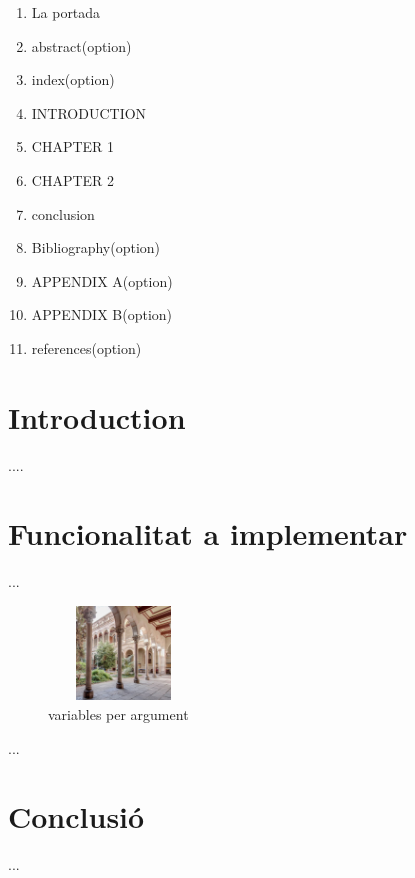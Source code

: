 \documentclass{article}
\begin{document}













\begin{enumerate}
  \item La portada
  \item abstract(option)
  \item index(option)
  \item INTRODUCTION
  \item CHAPTER 1
  \item CHAPTER 2
  \item conclusion
  \item Bibliography(option)
  \item APPENDIX A(option)
  \item APPENDIX B(option)
  \item references(option)
\end{enumerate}









\section{Introduction}


....
 
\section{Funcionalitat a implementar}

...

\begin{figure}[H]
    \centering
    \includegraphics[width=4cm, height=2.5cm]{images/edifici-historic-universitat-de-barcelona.jpg}
    \caption{variables per argument}
    \label{taula}
\end{figure}%



...


\section{Conclusió}

...








 
\end{document}
